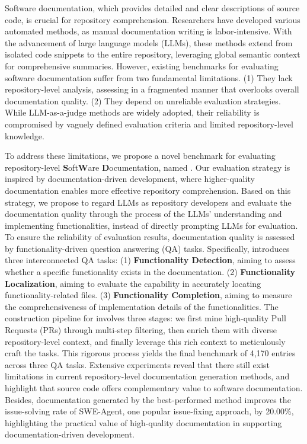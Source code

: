 Software documentation, which provides detailed and clear descriptions of source code, is crucial for repository comprehension. Researchers have developed various automated methods, as manual documentation writing is labor-intensive. With the advancement of large language models (LLMs), these methods extend from isolated code snippets to the entire repository, leveraging global semantic context for comprehensive summaries. However, existing benchmarks for evaluating software documentation suffer from two fundamental limitations. (1) They lack repository-level analysis, assessing in a fragmented manner that overlooks overall documentation quality. (2) They depend on unreliable evaluation strategies. While LLM-as-a-judge methods are widely adopted, their reliability is compromised by vaguely defined evaluation criteria and limited repository-level knowledge.

To address these limitations, we propose a novel benchmark for evaluating repository-level \textbf{S}oft\textbf{W}are \textbf{D}ocumentation, named \textbf{\benchmark}. Our evaluation strategy is inspired by documentation-driven development, where higher-quality documentation enables more effective repository comprehension. Based on this strategy, we propose to regard LLMs as repository developers and evaluate the documentation quality through the process of the LLMs' understanding and implementing functionalities, instead of directly prompting LLMs for evaluation. To ensure the reliability of evaluation results, documentation quality is assessed by functionality-driven question answering (QA) tasks.
Specifically, \benchmark introduces three interconnected QA tasks: (1) \textbf{Functionality Detection}, aiming to assess whether a specific functionality exists in the documentation.
(2) \textbf{Functionality Localization}, aiming to evaluate the capability in accurately locating functionality-related files. (3) \textbf{Functionality Completion}, aiming to measure the comprehensiveness of implementation details of the functionalities.
The construction pipeline for \benchmark involves three stages: we first mine high-quality Pull Requests (PRs) through multi-step filtering, then enrich them with diverse repository-level context, and finally leverage this rich context to meticulously craft the tasks. This rigorous process yields the final benchmark of 4,170 entries across three QA tasks. Extensive experiments reveal that there still exist limitations in current repository-level documentation generation methods, and highlight that source code offers complementary value to software documentation. Besides, documentation generated by the best-performed method improves the issue-solving rate of SWE-Agent, one popular issue-fixing approach, by 20.00\%, highlighting the practical value of high-quality documentation in supporting documentation-driven development.